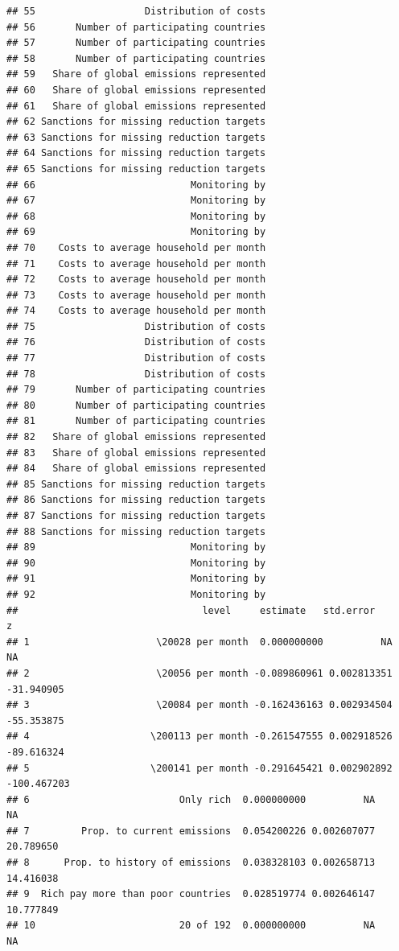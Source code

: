 \documentclass[a4paper,12pt]{article}\usepackage[]{graphicx}\usepackage[]{color}
\makeatletter
\newenvironment{kframe}{%
 \def\at@end@of@kframe{}%
 \ifinner\ifhmode%
  \def\at@end@of@kframe{\end{minipage}}%
  \begin{minipage}{\columnwidth}%
 \fi\fi%
 \def\FrameCommand##1{\hskip\@totalleftmargin \hskip-\fboxsep
 \colorbox{shadecolor}{##1}\hskip-\fboxsep
     \hskip-\linewidth \hskip-\@totalleftmargin \hskip\columnwidth}%
 \MakeFramed {\advance\hsize-\width
   \@totalleftmargin\z@ \linewidth\hsize
   \@setminipage}}%
 {\par\unskip\endMakeFramed%
 \at@end@of@kframe}
\newenvironment{knitrout}{}{} %
\makeatother
\begin{document}
\begin{knitrout}
\begin{kframe}
\begin{verbatim}
## 55                   Distribution of costs
## 56       Number of participating countries
## 57       Number of participating countries
## 58       Number of participating countries
## 59   Share of global emissions represented
## 60   Share of global emissions represented
## 61   Share of global emissions represented
## 62 Sanctions for missing reduction targets
## 63 Sanctions for missing reduction targets
## 64 Sanctions for missing reduction targets
## 65 Sanctions for missing reduction targets
## 66                           Monitoring by
## 67                           Monitoring by
## 68                           Monitoring by
## 69                           Monitoring by
## 70    Costs to average household per month
## 71    Costs to average household per month
## 72    Costs to average household per month
## 73    Costs to average household per month
## 74    Costs to average household per month
## 75                   Distribution of costs
## 76                   Distribution of costs
## 77                   Distribution of costs
## 78                   Distribution of costs
## 79       Number of participating countries
## 80       Number of participating countries
## 81       Number of participating countries
## 82   Share of global emissions represented
## 83   Share of global emissions represented
## 84   Share of global emissions represented
## 85 Sanctions for missing reduction targets
## 86 Sanctions for missing reduction targets
## 87 Sanctions for missing reduction targets
## 88 Sanctions for missing reduction targets
## 89                           Monitoring by
## 90                           Monitoring by
## 91                           Monitoring by
## 92                           Monitoring by
##                                level     estimate   std.error           z
## 1                      \20028 per month  0.000000000          NA          NA
## 2                      \20056 per month -0.089860961 0.002813351  -31.940905
## 3                      \20084 per month -0.162436163 0.002934504  -55.353875
## 4                     \200113 per month -0.261547555 0.002918526  -89.616324
## 5                     \200141 per month -0.291645421 0.002902892 -100.467203
## 6                          Only rich  0.000000000          NA          NA
## 7         Prop. to current emissions  0.054200226 0.002607077   20.789650
## 8      Prop. to history of emissions  0.038328103 0.002658713   14.416038
## 9  Rich pay more than poor countries  0.028519774 0.002646147   10.777849
## 10                         20 of 192  0.000000000          NA          NA

\end{verbatim}
\end{kframe}
\end{knitrout}
\end{document}
